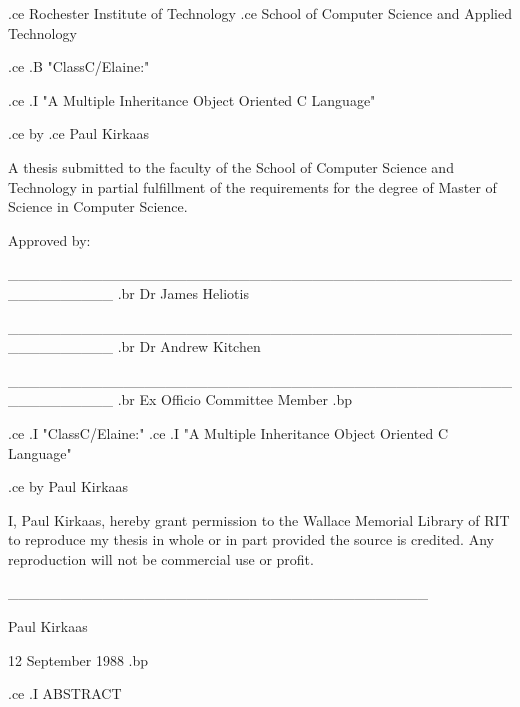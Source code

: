 
.ce
Rochester Institute of Technology
.ce
School of Computer Science and Applied Technology


.ce
.B "ClassC/Elaine:"

.ce
.I "A Multiple Inheritance Object Oriented C Language"


.ce
by
.ce
Paul Kirkaas


A thesis submitted to the faculty of the School of Computer Science and
Technology in partial fulfillment of the requirements for the degree of
Master of Science in Computer Science.

Approved by:


__________________________________________________________
.br
Dr James Heliotis



__________________________________________________________
.br
Dr Andrew Kitchen



__________________________________________________________
.br
Ex Officio Committee Member
.bp













.ce
.I "ClassC/Elaine:"
.ce
.I "A Multiple Inheritance Object Oriented C Language"


.ce
by Paul Kirkaas









I, Paul Kirkaas, hereby grant permission to the Wallace Memorial Library of
RIT to reproduce my thesis in whole or in part provided the source is
credited.  Any reproduction will not be commercial use or profit.








________________________________________

Paul Kirkaas

12 September 1988
.bp




.ce
.I ABSTRACT

